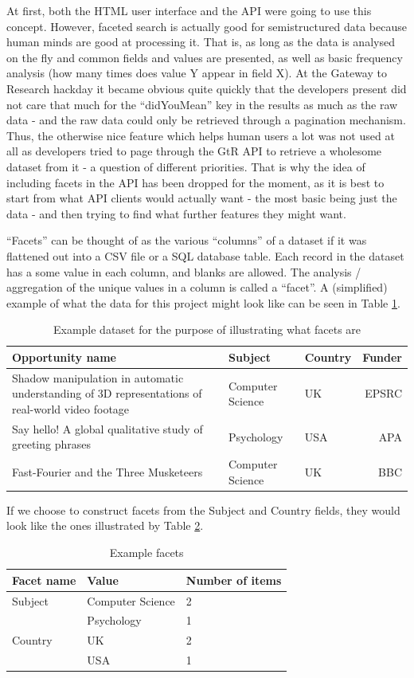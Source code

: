 At first, both the HTML user interface and the API were going to use this concept. However, faceted search is actually good for semistructured data because human minds are good at processing it. That is, as long as the data is analysed on the fly and  common fields and values are presented, as well as basic frequency analysis (how many times does value Y appear in field X). At the Gateway to Research hackday it became obvious quite quickly that the developers present did not care that much for the ``didYouMean'' key in the results as much as the raw data - and the raw data could only be retrieved through a pagination mechanism. Thus, the otherwise nice feature which helps human users a lot was not used at all as developers tried to page through the GtR API to retrieve a wholesome dataset from it - a question of different priorities. That is why the idea of including facets in the API has been dropped for the moment, as it is best to start from what API clients would actually want - the most basic being just 
the data - and then trying to find what further features they might want.

``Facets'' can be thought of as the various ``columns'' of a dataset if it was flattened out into a CSV file or a SQL database table. Each record in the dataset has a some value in each column, and blanks are allowed. The analysis / aggregation of the unique values in a column is called a ``facet''. A (simplified) example of what the data for this project might look like can be seen in Table \ref{tab:facets-example}.

\begin{table}[!h]
\centering
\begin{tabular}{p{8cm}|l|l|r}
	Opportunity name & Subject & Country & Funder\\
	\hline
	Shadow manipulation in automatic understanding of 3D representations of real-world video footage & Computer Science & UK & EPSRC\\[6pt]
	Say hello! A global qualitative study of greeting phrases & Psychology & USA & APA\\[6pt]
	Fast-Fourier and the Three Musketeers & Computer Science & UK & BBC\\
\end{tabular}
\caption{Example dataset for the purpose of illustrating what facets are}
\label{tab:facets-example}
\end{table}

If we choose to construct facets from the Subject and Country fields, they would look like the ones illustrated by Table \ref{tab:facets-example2}.
\begin{table}[!h]
\centering
\begin{tabular}{l|l|l}
	Facet name & Value & Number of items\\
	\hline
	Subject & Computer Science & 2\\[3pt]
	 & Psychology & 1\\[3pt]
	Country & UK & 2\\[3pt]
	 & USA & 1\\[3pt]
\end{tabular}
\caption{Example facets}
\label{tab:facets-example2}
\end{table}


